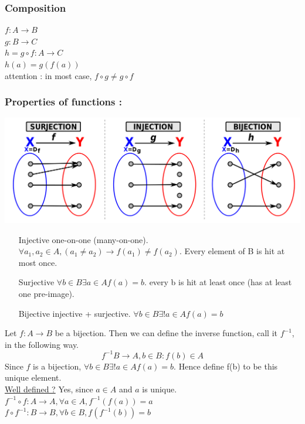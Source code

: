 \documentclass[12pt,a4paper]{article}
\begin{document}
\subsubsection{Composition}
$f: A \rightarrow B$\\
$g: B \rightarrow C$\\
$h = g \circ f : A \rightarrow C$\\
$h(a) = g(f(a))$\\
attention : in most case, $f \circ g \neq g \circ f$

\subsubsection{Properties of functions :}
\includegraphics[scale=0.25]{images/fonctions.png}
\begin{itemize}
\item[Injective] one-on-one (many-on-one). $\forall a_1, a_2 \in A, (a_1 \neq a_2) \rightarrow f(a_1) \neq f(a_2)$. Every element of B is hit at most once.
\item[Surjective] $\forall b \in B \exists a \in A f(a) = b$. every b is hit at least once (has at least one pre-image).
\item[Bijective] injective + surjective. $\forall b \in B \exists ! a \in A f(a) = b$
\end{itemize}
Let $f:A \rightarrow B$ be a bijection. Then we can define the inverse function, call it $f^{-1}$, in the following way. 
\begin{equation}
f^{-1} B \rightarrow A, b \in B : f(b) \in A
\end{equation}
Since $f$ is a bijection, $\forall b \in B \exists ! a \in A f(a) = b$. Hence define f(b) to be this unique element.\\
\underline{Well defined ?} Yes, since $a \in A$ and $a$ is unique.\\
$f^{-1} \circ f : A \rightarrow A, \forall a \in A, f^{-1}(f(a)) = a$\\
$f \circ f^{-1} : B \rightarrow B, \forall b \in B, f(f^{-1}(b)) = b$\\
\end{document}
